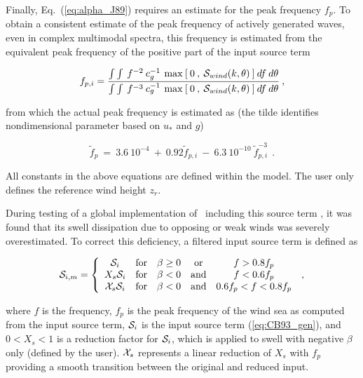 \noindent
Finally, Eq.~(\ref{eq:alpha_J89}) requires an estimate for the peak frequency
$f_p$. To obtain a consistent estimate of the peak frequency of actively
generated waves, even in complex multimodal spectra, this frequency is
estimated from the equivalent peak frequency of the positive part of the input
source term \citep[see][]{tol:JPO96}


\begin{equation}
f_{p,i} =
\frac { \int \int \: f^{-2} \: c_g^{-1} \:
\max \: [ \: 0 \:,\: \cS_{wind}(k,\theta) \: ] \: d f \: d\theta }
{ \int \int \: f^{-3} \: c_g^{-1} \:
\max \: [ \: 0 \:,\: \cS_{wind}(k,\theta) \: ] \: d f \: d\theta }
\: , \label{eq:fp_ir}
\end{equation}

\noindent
from which the actual peak frequency is estimated as (the tilde identifies
nondimensional parameter based on $u_\ast$ and $g$)


\begin{equation}
\tilde{f}_p \: = \: 3.6 \: 10^{-4} \: + \: 0.92 \tilde{f}_{p,i}
\: - \: 6.3 \: 10^{-10} \: \tilde{f}_{p,i}^{-3}
\:\: . \label{eq:fp_fpi} \end{equation}

\noindent
All constants in the above equations are defined within the model. The user
only defines the reference wind height $z_r$.

During testing of a global implementation of \ws\ including this source term
\citep{tol:OMB02a}, it was found that its swell dissipation due to opposing or
weak winds was severely overestimated. To correct this deficiency, a filtered
input source term is defined as


\begin{equation}
\cS_{i,m} = \left \{ \begin{array}{ccccc}
    \cS_i         & \mbox{for} & \beta \geq 0 & \mbox{or}  & f > 0.8 f_p \\
  X_s \cS_i       & \mbox{for} & \beta < 0    & \mbox{and} & f < 0.6 f_p \\
{\cal{X}}_s \cS_i & \mbox{for} & \beta < 0    & \mbox{and} & 0.6 f_p < f < 0.8 f_p
\end{array} \right . \: , \label{eq:swellf} \end{equation}

\noindent
where $f$ is the frequency, $f_p$ is the peak frequency of the wind sea as
computed from the input source term, ${\cal S}_i$ is the input source term
(\ref{eq:CB93_gen}), and $0 < X_s < 1$ is a reduction factor for ${\cal S}_i$,
which is applied to swell with negative $\beta$ only (defined by the
user). ${\cal{X}}_s$ represents a linear reduction of $X_s$ with $f_p$
providing a smooth transition between the original and reduced input.

